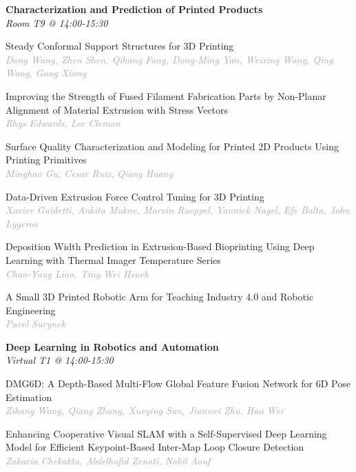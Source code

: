 \begin{multicols*}{2}
\normalsize \textbf{Characterization and Prediction of Printed Products}\\
\small \textit{Room T9 @ 14:00-15:30}

\small Steady Conformal Support Structures for 3D Printing\\ 
\footnotesize \textcolor{darkgray}{\textit{Dong Wang, Zhen  Shen, Qihang  Fang, Dong-Ming  Yan, Weixing  Wang, Qing  Wang, Gang  Xiong}}

\small Improving the Strength of Fused Filament Fabrication Parts by Non-Planar Alignment of Material Extrusion with Stress Vectors\\ 
\footnotesize \textcolor{darkgray}{\textit{Rhys Edwards, Lee  Clemon}}

\small Surface Quality Characterization and Modeling for Printed 2D Products Using Printing Primitives\\ 
\footnotesize \textcolor{darkgray}{\textit{Minghao Gu, Cesar  Ruiz, Qiang  Huang}}

\small Data-Driven Extrusion Force Control Tuning for 3D Printing\\ 
\footnotesize \textcolor{darkgray}{\textit{Xavier Guidetti, Ankita  Mukne, Marvin  Rueppel, Yannick  Nagel, Efe  Balta, John  Lygeros}}

\small Deposition Width Prediction in Extrusion-Based Bioprinting Using Deep Learning with Thermal Imager Temperature Series\\ 
\footnotesize \textcolor{darkgray}{\textit{Chao-Yaug Liao, Ting Wei  Hsueh}}

\small A Small 3D Printed Robotic Arm for Teaching Industry 4.0 and Robotic Engineering\\ 
\footnotesize \textcolor{darkgray}{\textit{Pavel Surynek}}

\normalsize \textbf{Deep Learning in Robotics and Automation}\\
\small \textit{Virtual T1 @ 14:00-15:30}

\small DMG6D: A Depth-Based Multi-Flow Global Feature Fusion Network for 6D Pose Estimation\\ 
\footnotesize \textcolor{darkgray}{\textit{Zihang Wang, Qiang  Zhang, Xueying  Sun, Jianwei  Zhu, Hao  Wei}}

\small Enhancing Cooperative Visual SLAM with a Self-Supervised Deep Learning Model for Efficient Keypoint-Based Inter-Map Loop Closure Detection\\ 
\footnotesize \textcolor{darkgray}{\textit{Zakaria Chekakta, Abdelhafid  Zenati, Nabil  Aouf}}


\end{multicols*}
